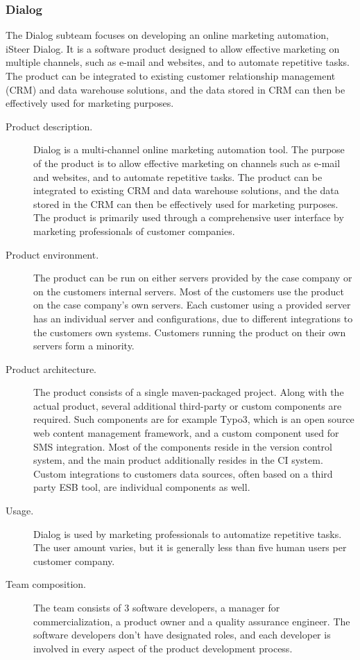 \documentclass[english]{tktltiki2}
\theoremstyle{definition}
\theoremstyle{remark}
\begin{document}
\subsubsection{Dialog}
The Dialog subteam focuses on developing an online marketing automation, iSteer Dialog. It is a software product designed to allow effective marketing on multiple channels, such as e-mail and websites, and to automate repetitive tasks. The product can be integrated to existing customer relationship management (CRM) and data warehouse solutions, and the data stored in CRM can then be effectively used for marketing purposes. 

\begin{description}
  \item[Product description.] Dialog is a multi-channel online marketing automation tool. The purpose of the product is to allow effective marketing on channels such as e-mail and websites, and to automate repetitive tasks. The product can be integrated to existing CRM and data warehouse solutions, and the data stored in the CRM can then be effectively used for marketing purposes. The product is primarily used through a comprehensive user interface by marketing professionals of customer companies. 
  \item[Product environment.] The product can be run on either servers provided by the case company or on the customers internal servers. Most of the customers use the product on the case company's own servers. Each customer using a provided server has an individual server and configurations, due to different integrations to the customers own systems. Customers running the product on their own servers form a minority.
  \item[Product architecture.] The product consists of a single maven-packaged project. Along with the actual product, several additional third-party or custom components are required. Such components are for example Typo3, which is an open source web content management framework, and a custom component used for SMS integration. Most of the components reside in the version control system, and the main product additionally resides in the CI system. Custom integrations to customers data sources, often based on a third party ESB tool, are individual components as well.
  \item[Usage.] Dialog is used by marketing professionals to automatize repetitive tasks. The user amount varies, but it is generally less than five human users per customer company.
  \item[Team composition.] The team consists of 3 software developers, a manager for commercialization, a product owner and a quality assurance engineer. The software developers don't have designated roles, and each developer is involved in every aspect of the product development process.

\end{description}
\end{document}
